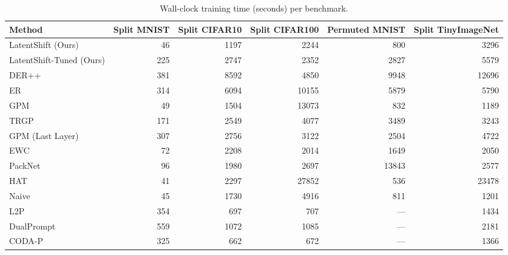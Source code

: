\begin{table}[t]
\centering
\caption{Wall-clock training time (seconds) per benchmark.}
\label{tab:cost}
\begin{tabular}{lrrrrr}
\toprule
Method & Split MNIST & Split CIFAR10 & Split CIFAR100 & Permuted MNIST & Split TinyImageNet \\
\midrule
LatentShift (Ours) & 46 & 1197 & 2244 & 800 & 3296 \\
LatentShift-Tuned (Ours) & 225 & 2747 & 2352 & 2827 & 5579 \\
DER++ & 381 & 8592 & 4850 & 9948 & 12696 \\
ER & 314 & 6094 & 10155 & 5879 & 5790 \\
GPM & 49 & 1504 & 13073 & 832 & 1189 \\
TRGP & 171 & 2549 & 4077 & 3489 & 3243 \\
GPM (Last Layer) & 307 & 2756 & 3122 & 2504 & 4722 \\
EWC & 72 & 2208 & 2014 & 1649 & 2050 \\
PackNet & 96 & 1980 & 2697 & 13843 & 2577 \\
HAT & 41 & 2297 & 27852 & 536 & 23478 \\
Naive & 45 & 1730 & 4916 & 811 & 1201 \\
L2P & 354 & 697 & 707 & --- & 1434 \\
DualPrompt & 559 & 1072 & 1085 & --- & 2181 \\
CODA-P & 325 & 662 & 672 & --- & 1366 \\
\bottomrule
\end{tabular}
\end{table}